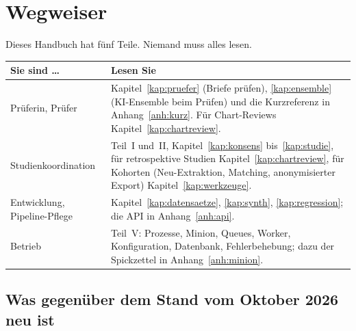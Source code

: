 \documentclass[11pt,a4paper,parskip=half-,headings=standardclasses,toc=bibliography,open=any]{scrreprt}
\begin{document}
\chapter*{Wegweiser}

Dieses Handbuch hat fünf Teile. Niemand muss alles lesen.

\begin{tabularx}{\textwidth}{@{}P{4.4cm}L@{}}
\toprule
\textbf{Sie sind …} & \textbf{Lesen Sie}\\
\midrule
Prüferin, Prüfer & Kapitel~\ref{kap:pruefer} (Briefe prüfen), \ref{kap:ensemble} (KI-Ensemble beim Prüfen) und die Kurzreferenz in Anhang~\ref{anh:kurz}. Für Chart-Reviews Kapitel~\ref{kap:chartreview}.\\
Studienkoordination & Teil~I und~II, Kapitel~\ref{kap:konsens} bis~\ref{kap:studie}, für retrospektive Studien Kapitel~\ref{kap:chartreview}, für Kohorten (Neu-Extraktion, Matching, anonymisierter Export) Kapitel~\ref{kap:werkzeuge}.\\
Entwicklung, Pipeline-Pflege & Kapitel~\ref{kap:datensaetze}, \ref{kap:synth}, \ref{kap:regression}; die API in Anhang~\ref{anh:api}.\\
Betrieb & Teil~V: Prozesse, Minion, Queues, Worker, Konfiguration, Datenbank, Fehlerbehebung; dazu der Spickzettel in Anhang~\ref{anh:minion}.\\
\bottomrule
\end{tabularx}

\section*{Was gegenüber dem Stand vom Oktober 2026 neu ist}
\end{document}
